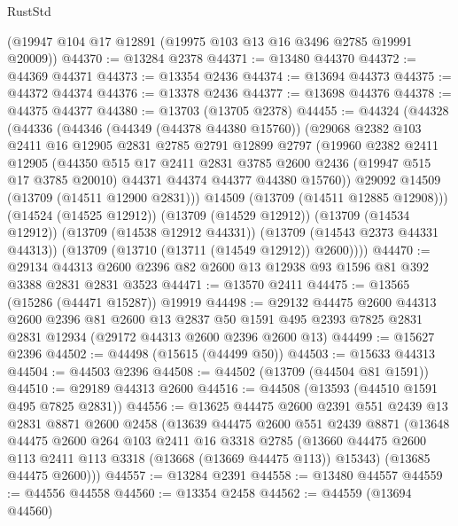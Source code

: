 \begin{lexlean}{RustStd}
\begin{coremodule}
    (@19947 @104 @17 @12891 (@19975 @103 @13 @16 @3496 @2785 @19991 @20009))
@44370 := @13284 @2378
@44371 := @13480 @44370
@44372 := @44369 @44371
@44373 := @13354 @2436
@44374 := @13694 @44373
@44375 := @44372 @44374
@44376 := @13378 @2436
@44377 := @13698 @44376
@44378 := @44375 @44377
@44380 := @13703 (@13705 @2378)
@44455 := @44324
    (@44328
      (@44336
        (@44346
          (@44349 (@44378 @44380 @15760))
          (@29068
            @2382
            @103
            @2411
            @16
            @12905
            @2831
            @2785
            @2791
            @12899
            @2797
            (@19960
              @2382
              @2411
              @12905
              (@44350
                @515
                @17
                @2411
                @2831
                @3785
                @2600
                @2436
                (@19947 @515 @17 @3785 @20010)
                @44371
                @44374
                @44377
                @44380
                @15760))
            @29092
            @14509
            (@13709 (@14511 @12900 @2831)))
          @14509
          (@13709 (@14511 @12885 @12908)))
        (@14524 (@14525 @12912))
        (@13709 (@14529 @12912))
        (@13709 (@14534 @12912))
        (@13709 (@14538 @12912 @44331))
        (@13709 (@14543 @2373 @44331 @44313))
        (@13709 (@13710 (@13711 (@14549 @12912)) @2600))))
@44470 := @29134 @44313 @2600 @2396 @82 @2600 @13 @12938 @93 @1596 @81 @392 @3388 @2831 @2831 @3523
@44471 := @13570 @2411
@44475 := @13565 (@15286 (@44471 @15287)) @19919
@44498 := @29132
    @44475
    @2600
    @44313
    @2600
    @2396
    @81
    @2600
    @13
    @2837
    @50
    @1591
    @495
    @2393
    @7825
    @2831
    @2831
    @12934
    (@29172 @44313 @2600 @2396 @2600 @13)
@44499 := @15627 @2396
@44502 := @44498 (@15615 (@44499 @50))
@44503 := @15633 @44313
@44504 := @44503 @2396
@44508 := @44502 (@13709 (@44504 @81 @1591))
@44510 := @29189 @44313 @2600
@44516 := @44508 (@13593 (@44510 @1591 @495 @7825 @2831))
@44556 := @13625
    @44475
    @2600
    @2391
    @551
    @2439
    @13
    @2831
    @8871
    @2600
    @2458
    (@13639
      @44475
      @2600
      @551
      @2439
      @8871
      (@13648
        @44475
        @2600
        @264
        @103
        @2411
        @16
        @3318
        @2785
        (@13660 @44475 @2600 @113 @2411 @113 @3318 (@13668 (@13669 @44475 @113)) @15343)
        (@13685 @44475 @2600)))
@44557 := @13284 @2391
@44558 := @13480 @44557
@44559 := @44556 @44558
@44560 := @13354 @2458
@44562 := @44559 (@13694 @44560)

\end{coremodule}
\end{lexlean}

